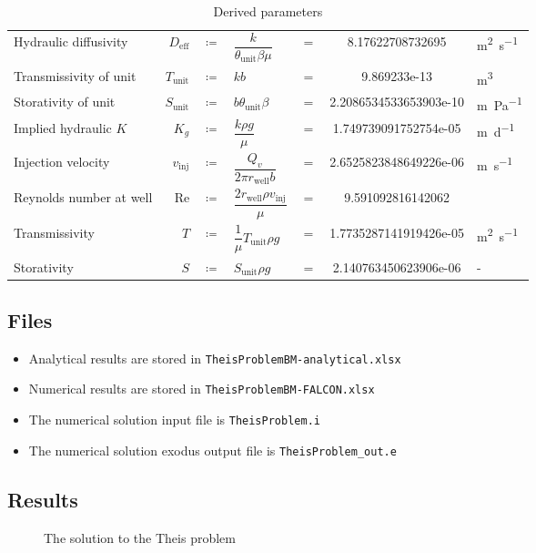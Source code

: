 \setlength{\tabcolsep}{3pt}
\renewcommand{\arraystretch}{1.5}
\begin{table}[h]
	\caption{Derived parameters}
	\begin{center}
		\begin{tabular}{lrclcSs}
		Hydraulic diffusivity & $D_{\text{eff}}$ & $\coloneqq$ & $ \dfrac{k}{\theta_{\text{unit}}\beta\mu}$ & $=$ &8.17622708732695&\si{\metre\squared\per\second} \\
		Transmissivity of unit & $T_{\text{unit}}$ & $\coloneqq$ & $k b $& $=$ &9.869233e-13& \si{\metre\cubed} \\
		Storativity of unit & $S_{\text{unit}}$ & $\coloneqq$ & $b\theta_{\text{unit}}\beta$& $=$ &2.2086534533653903e-10&\si{\metre\per\pascal} \\
		Implied hydraulic $K$ & $K_{g}$ & $\coloneqq$ & $\dfrac{k\rho g}{\mu}$& $=$ &1.749739091752754e-05&\si{\metre\per\day} \\
		Injection velocity & $v_{\text{inj}}$ & $\coloneqq$ & $\dfrac{Q_v}{2\pi r_{\text{well}}b}$& $=$ &2.6525823848649226e-06&\si{\metre\per\second} \\
		Reynolds number at well & $\text{Re}$ & $\coloneqq$ & $\dfrac{2 r_{\text{well}}\rho v_{\text{inj}}}{\mu}$& $=$ &9.591092816142062& \\

		Transmissivity & $T$ & $\coloneqq$ & $\dfrac{1}{\mu}T_{\text{unit}}\rho g $& $=$ & 1.7735287141919426e-05& \si{\metre\squared\per\second} \\

		Storativity & $S$ & $\coloneqq$ & $S_{\text{unit}}\rho g$& $=$ &  2.140763450623906e-06&  -
	\end{tabular}
	\end{center}
	\label{tab:TheisDerivPar}
\end{table}

\subsection{Files}
\begin{itemize}
	\item Analytical results are stored in \verb|TheisProblemBM-analytical.xlsx|
	\item Numerical results are stored in \verb|TheisProblemBM-FALCON.xlsx|
	\item The numerical solution input file is \verb|TheisProblem.i|
	\item The numerical solution exodus output file is \verb|TheisProblem_out.e|
\end{itemize}
\newpage
\subsection{Results}

\begin{figure}[h!]
	\begin{center}
		\setlength\figureheight{8cm} 
		\setlength{} 
		
	\end{center}
	\caption{The solution to the Theis problem}
	\label{fig:Theis}
\end{figure}
